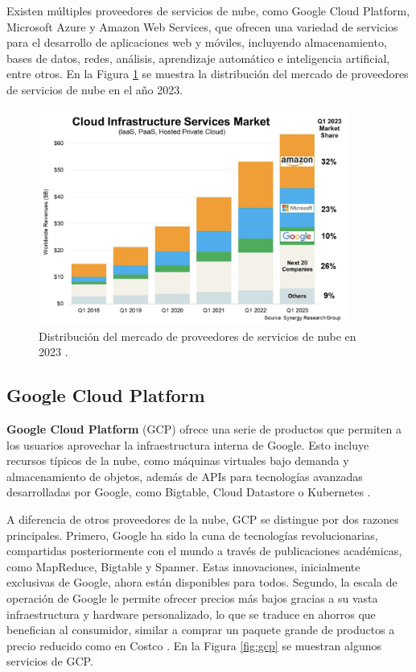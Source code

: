 Existen múltiples proveedores de servicios de nube, como Google Cloud Platform,
Microsoft Azure y Amazon Web Services, que ofrecen una variedad de servicios
para el desarrollo de aplicaciones web y móviles, incluyendo almacenamiento,
bases de datos, redes, análisis, aprendizaje automático e inteligencia artificial,
entre otros. En la Figura \ref{fig:cloud-providers-market-share} se muestra la
distribución del mercado de proveedores de servicios de nube en el año 2023.

\begin{figure}[!htbp]
  \centering
  \includegraphics[width=0.9\textwidth]{imagenes/02-marco-teorico/cloud-providers-market-share.png}
  \caption[Distribución del mercado de proveedores de servicios de nube en 2023]{Distribución del mercado de proveedores de servicios de nube en 2023 \cite{john_2023}.}
  \label{fig:cloud-providers-market-share}
\end{figure}

\subsection{Google Cloud Platform}

\textbf{Google Cloud Platform} (GCP) ofrece una serie de productos que permiten
a los usuarios aprovechar la infraestructura interna de Google. Esto incluye
recursos típicos de la nube, como máquinas virtuales bajo demanda y almacenamiento
de objetos, además de APIs para tecnologías avanzadas desarrolladas por Google,
como Bigtable, Cloud Datastore o Kubernetes \cite{geewax2018google}.

A diferencia de otros proveedores de la nube, GCP se distingue por dos razones
principales. Primero, Google ha sido la cuna de tecnologías revolucionarias,
compartidas posteriormente con el mundo a través de publicaciones académicas,
como MapReduce, Bigtable y Spanner. Estas innovaciones, inicialmente exclusivas
de Google, ahora están disponibles para todos. Segundo, la escala de operación
de Google le permite ofrecer precios más bajos gracias a su vasta infraestructura
y hardware personalizado, lo que se traduce en ahorros que benefician al
consumidor, similar a comprar un paquete grande de productos a precio reducido
como en Costco \cite{geewax2018google}. En la Figura \ref{fig:gcp} se muestran
algunos servicios de GCP.

